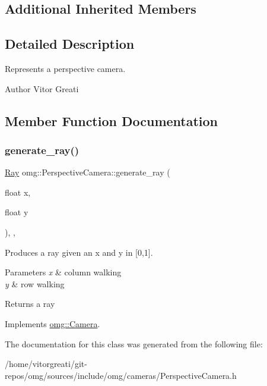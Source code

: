 \subsection*{Additional Inherited Members}


\subsection{Detailed Description}
Represents a perspective camera. 

\begin{DoxyAuthor}{Author}
Vitor Greati 
\end{DoxyAuthor}


\subsection{Member Function Documentation}
\mbox{\label{classomg_1_1_perspective_camera_a6d849c2b0768f12aed7b50d3ce87afeb}} 
\subsubsection{\texorpdfstring{generate\_ray()}{generate\_ray()}}
{\footnotesize\ttfamily \mbox{\hyperlink{classomg_1_1_ray}{Ray}} omg\+::\+Perspective\+Camera\+::generate\+\_\+ray (\begin{DoxyParamCaption}\item[{float}]{x,  }\item[{float}]{y }\end{DoxyParamCaption})\hspace{0.3cm}{\ttfamily [inline]}, {\ttfamily [override]}, {\ttfamily [virtual]}}



Produces a ray given an x and y in \mbox{[}0,1\mbox{]}. 


\begin{DoxyParams}{Parameters}
{\em x} & column walking \\
\hline
{\em y} & row walking \\
\hline
\end{DoxyParams}
\begin{DoxyReturn}{Returns}
a ray 
\end{DoxyReturn}


Implements \mbox{\hyperlink{classomg_1_1_camera_aca08c044082cb3573d606a8c851f52fe}{omg\+::\+Camera}}.



The documentation for this class was generated from the following file\+:\begin{DoxyCompactItemize}
\item 
/home/vitorgreati/git-\/repos/omg/sources/include/omg/cameras/Perspective\+Camera.\+h\end{DoxyCompactItemize}
